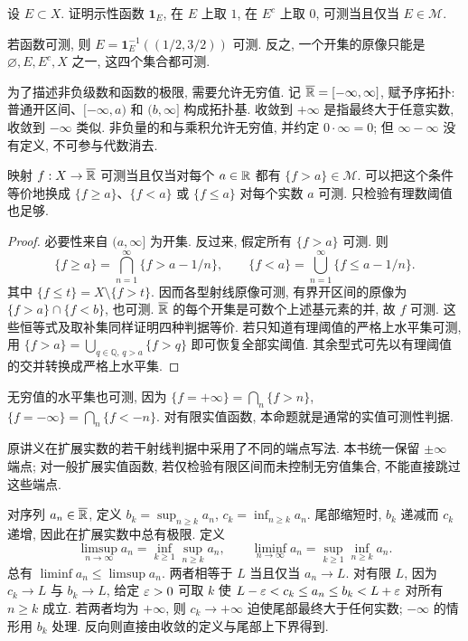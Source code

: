 \begin{example}
设 $E\subset X$. 证明示性函数 $\mathbf 1_E$, 在 $E$ 上取 $1$, 在 $E^c$ 上取 $0$, 可测当且仅当 $E\in\mathcal M$.
\end{example}
\begin{solution}
若函数可测, 则 $E=\mathbf 1_E^{-1}((1/2,3/2))$ 可测. 反之, 一个开集的原像只能是 $\varnothing,E,E^c,X$ 之一, 这四个集合都可测.
\end{solution}

为了描述非负级数和函数的极限, 需要允许无穷值. 记 $\overline{\mathbb R}=[-\infty,\infty]$, 赋予序拓扑: 普通开区间、$[-\infty,a)$ 和 $(b,\infty]$ 构成拓扑基. 收敛到 $+\infty$ 是指最终大于任意实数, 收敛到 $-\infty$ 类似. 非负量的和与乘积允许无穷值, 并约定 $0\cdot\infty=0$; 但 $\infty-\infty$ 没有定义, 不可参与代数消去.

\begin{proposition}\label{ra:c1:ray-test}
映射 $f:X\to\overline{\mathbb R}$ 可测当且仅当对每个 $a\in\mathbb R$ 都有 $\{f>a\}\in\mathcal M$. 可以把这个条件等价地换成 $\{f\ge a\}$、$\{f<a\}$ 或 $\{f\le a\}$ 对每个实数 $a$ 可测. 只检验有理数阈值也足够.
\end{proposition}
\begin{proof}
必要性来自 $(a,\infty]$ 为开集. 反过来, 假定所有 $\{f>a\}$ 可测. 则
\[
 \{f\ge a\}=\bigcap_{n=1}^{\infty}\{f>a-1/n\},\qquad
 \{f<a\}=\bigcup_{n=1}^{\infty}\{f\le a-1/n\}.
\]
其中 $\{f\le t\}=X\setminus\{f>t\}$. 因而各型射线原像可测, 有界开区间的原像为 $\{f>a\}\cap\{f<b\}$, 也可测. $\overline{\mathbb R}$ 的每个开集是可数个上述基元素的并, 故 $f$ 可测. 这些恒等式及取补集同样证明四种判据等价. 若只知道有理阈值的严格上水平集可测, 用 $\{f>a\}=\bigcup_{q\in\mathbb Q,\,q>a}\{f>q\}$ 即可恢复全部实阈值. 其余型式可先以有理阈值的交并转换成严格上水平集.
\end{proof}
无穷值的水平集也可测, 因为 $\{f=+\infty\}=\bigcap_n\{f>n\}$, $\{f=-\infty\}=\bigcap_n\{f<-n\}$. 对有限实值函数, 本命题就是通常的实值可测性判据.

\begin{remark}
原讲义在扩展实数的若干射线判据中采用了不同的端点写法. 本书统一保留 $\pm\infty$ 端点; 对一般扩展实值函数, 若仅检验有限区间而未控制无穷值集合, 不能直接跳过这些端点.
\end{remark}

对序列 $a_n\in\overline{\mathbb R}$, 定义 $b_k=\sup_{n\ge k}a_n$, $c_k=\inf_{n\ge k}a_n$. 尾部缩短时, $b_k$ 递减而 $c_k$ 递增, 因此在扩展实数中总有极限. 定义
\[
 \limsup_{n\to\infty}a_n=\inf_{k\ge1}\sup_{n\ge k}a_n,\qquad
 \liminf_{n\to\infty}a_n=\sup_{k\ge1}\inf_{n\ge k}a_n.
\]
总有 $\liminf a_n\le\limsup a_n$. 两者相等于 $L$ 当且仅当 $a_n\to L$. 对有限 $L$, 因为 $c_k\to L$ 与 $b_k\to L$, 给定 $\varepsilon>0$ 可取 $k$ 使 $L-\varepsilon<c_k\le a_n\le b_k<L+\varepsilon$ 对所有 $n\ge k$ 成立. 若两者均为 $+\infty$, 则 $c_k\to+\infty$ 迫使尾部最终大于任何实数; $-\infty$ 的情形用 $b_k$ 处理. 反向则直接由收敛的定义与尾部上下界得到.

